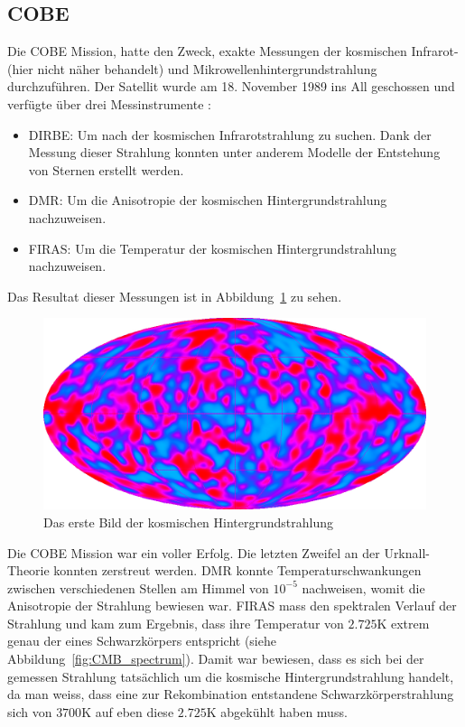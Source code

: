 \subsection{\ac{COBE}}
Die \ac{COBE} Mission, hatte den Zweck, exakte 
Messungen der kosmischen Infrarot-(hier nicht näher behandelt) und 
Mikrowellenhintergrundstrahlung durchzuführen.
Der Satellit wurde am 18. November 1989 ins All geschossen und verfügte über 
drei Messinstrumente \cite{cmb:COBE}:
\begin{itemize}
	\item \ac{DIRBE}: Um nach der 
	kosmischen Infrarotstrahlung zu suchen.
	Dank der Messung dieser Strahlung konnten unter anderem Modelle der 
	Entstehung von Sternen erstellt werden.
	\item \ac{DMR}: Um die Anisotropie der 
	kosmischen Hintergrundstrahlung nachzuweisen.
	\item \ac{FIRAS}: Um die Temperatur 
	der kosmischen Hintergrundstrahlung nachzuweisen. 
\end{itemize}

Das Resultat dieser Messungen ist in Abbildung~\ref{fig:COBE} zu sehen.
\begin{figure}
	\includegraphics[width=\linewidth]{cmb/images/CMB_COBE.png}
	\caption{Das erste Bild der kosmischen Hintergrundstrahlung}
	\label{fig:COBE}
\end{figure}
Die \ac{COBE} Mission war ein voller Erfolg.
Die letzten Zweifel an der Urknall-Theorie konnten zerstreut werden.
\ac{DMR} konnte Temperaturschwankungen zwischen verschiedenen Stellen am Himmel 
von $10^{-5}$ nachweisen, womit die Anisotropie der Strahlung bewiesen war.
\ac{FIRAS} mass den spektralen Verlauf der Strahlung und kam zum Ergebnis, dass 
ihre Temperatur von $2.725 \text{K}$ extrem genau der eines Schwarzkörpers 
entspricht (siehe Abbildung~\ref{fig:CMB_spectrum}).
Damit war bewiesen, dass es sich bei der gemessen Strahlung tatsächlich um die 
kosmische Hintergrundstrahlung handelt, da man weiss, dass eine zur 
Rekombination entstandene Schwarzkörperstrahlung sich von $3700 \text{K}$ auf 
eben diese $2.725 \text{K}$ abgekühlt haben muss.

